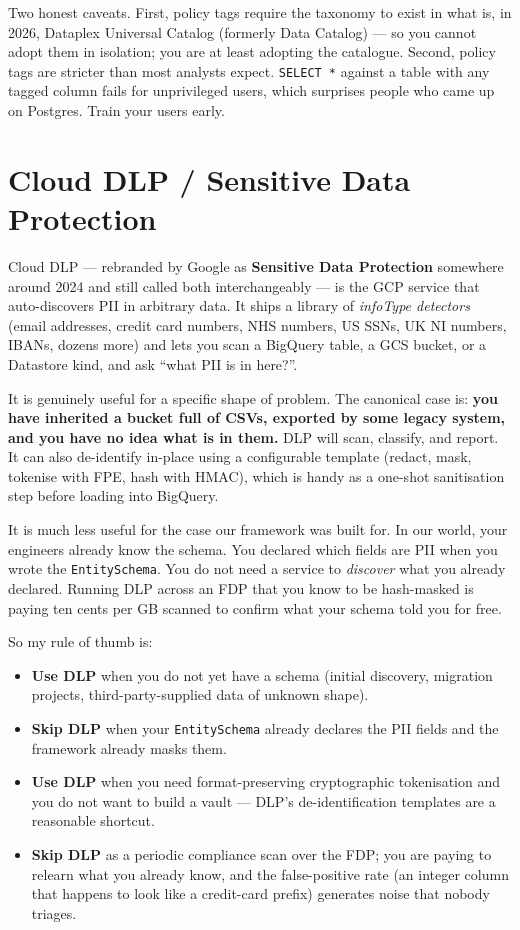 \documentclass[
  11pt,
  british,
  oneside]{book}
\providecommand{\tightlist}{%
  \setlength{\itemsep}{0pt}\setlength{\parskip}{0pt}}
\begin{document}
Two honest caveats. First, policy tags require the taxonomy to exist in
what is, in 2026, Dataplex Universal Catalog (formerly Data Catalog) ---
so you cannot adopt them in isolation; you are at least adopting the
catalogue. Second, policy tags are stricter than most analysts expect.
\texttt{SELECT\ *} against a table with any tagged column fails for
unprivileged users, which surprises people who came up on Postgres.
Train your users early.

\hypertarget{cloud-dlp-sensitive-data-protection}{%
\section{Cloud DLP / Sensitive Data
Protection}\label{cloud-dlp-sensitive-data-protection}}

Cloud DLP --- rebranded by Google as \textbf{Sensitive Data Protection}
somewhere around 2024 and still called both interchangeably --- is the
GCP service that auto-discovers PII in arbitrary
data. It ships a library of
\emph{infoType detectors} (email addresses, credit card numbers, NHS
numbers, US SSNs, UK NI numbers, IBANs, dozens more) and lets you scan a
BigQuery table, a GCS bucket, or a Datastore kind, and ask ``what PII is
in here?''.

It is genuinely useful for a specific shape of problem. The canonical
case is: \textbf{you have inherited a bucket full of CSVs, exported by
some legacy system, and you have no idea what is in them.} DLP will
scan, classify, and report. It can also de-identify in-place using a
configurable template (redact, mask, tokenise with FPE, hash with HMAC),
which is handy as a one-shot sanitisation step before loading into
BigQuery.

It is much less useful for the case our framework was built for. In our
world, your engineers already know the schema. You declared which fields
are PII when you wrote the \texttt{EntitySchema}. You do not need a
service to \emph{discover} what you already declared. Running DLP across
an FDP that you know to be hash-masked is paying ten cents per GB
scanned to confirm what your schema told you for free.

So my rule of thumb is:

\begin{itemize}
\tightlist
\item
  \textbf{Use DLP} when you do not yet have a schema (initial discovery,
  migration projects, third-party-supplied data of unknown shape).
\item
  \textbf{Skip DLP} when your \texttt{EntitySchema} already declares the
  PII fields and the framework already masks them.
\item
  \textbf{Use DLP} when you need format-preserving cryptographic
  tokenisation and you do not want to build a vault --- DLP's
  de-identification templates are a reasonable shortcut.
\item
  \textbf{Skip DLP} as a periodic compliance scan over the FDP; you are
  paying to relearn what you already know, and the false-positive rate
  (an integer column that happens to look like a credit-card prefix)
  generates noise that nobody triages.
\end{itemize}
\end{document}
